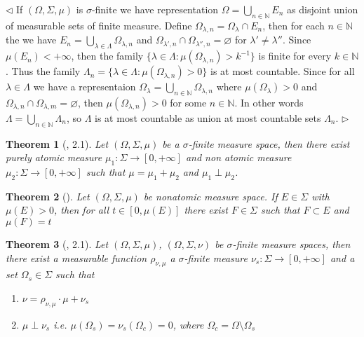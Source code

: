 \documentclass[12pt]{article}
\newtheorem{theorem}{Theorem}[subsection]
\newenvironment{proof}{\par $\triangleleft$}{$\triangleright$}
\begin{document}
\begin{proof}
    If $(\Omega,\Sigma,\mu)$ is $\sigma$-finite we have representation
    $\Omega=\bigcup_{n\in\mathbb{N}}E_n$ as disjoint union of measurable sets of
    finite measure. Define $\Omega_{\lambda, n}=\Omega_\lambda\cap E_n$, then
    for each $n\in\mathbb{N}$ the we have
    $E_n=\bigcup_{\lambda\in\Lambda}\Omega_{\lambda,n}$ and
    $\Omega_{\lambda',n}\cap\Omega_{\lambda'',n}=\varnothing$ for
    $\lambda'\neq\lambda''$. Since $\mu(E_n)<+\infty$, then the family $
        \{\lambda\in\Lambda:\mu(\Omega_{\lambda,n})>k^{-1} \}$ is finite for
    every
    $k\in\mathbb{N}$. Thus the family
    $\Lambda_n= \{\lambda\in\Lambda:\mu(\Omega_{\lambda,n})>0 \}$ is at
    most countable. Since for all $\lambda\in\Lambda$ we have a representaion
    $\Omega_\lambda=\bigcup_{n\in\mathbb{N}}\Omega_{\lambda,n}$ where
    $\mu(\Omega_\lambda)>0$ and
    $\Omega_{\lambda,n}\cap\Omega_{\lambda,m}=\varnothing$, then
    $\mu(\Omega_{\lambda,n})>0$ for some $n\in\mathbb{N}$. In other words
    $\Lambda=\bigcup_{n\in\mathbb{N}}\Lambda_n$, so $\Lambda$ is at most
    countable as union at most countable sets $\Lambda_n$.
\end{proof}

\begin{theorem}[\cite{RoyJAtNonAtMeas}, 2.1]\label{MeasSpDecomp} Let
    $(\Omega,\Sigma,\mu)$ be a $\sigma$-finite measure space, then there exist
    purely atomic measure $\mu_1:\Sigma\to[0,+\infty]$ and non atomic measure
    $\mu_2:\Sigma\to[0,+\infty]$ such that $\mu=\mu_1+\mu_2$ and
    $\mu_1\perp\mu_2$.
\end{theorem}

\begin{theorem}[\cite{SierpConFamlFunc}]\label{ContOfNonAtmMeas} Let
    $(\Omega,\Sigma,\mu)$ be nonatomic measure space. If $E\in\Sigma$  with
    $\mu(E)>0$, then for all $t\in[0,\mu(E)]$ there exist $F\in\Sigma$ such that
    $F\subset E$ and $\mu(F)=t$
\end{theorem}

\begin{theorem}[\cite{RoyJLebDecompTh}, 2.1]\label{LebMeasDecomp} Let
    $(\Omega,\Sigma,\mu)$, $(\Omega,\Sigma,\nu)$ be $\sigma$-finite measure
    spaces, then there exist a measurable function $\rho_{\nu,\mu}$ a
    $\sigma$-finite measure $\nu_s:\Sigma\to[0,+\infty]$ and a set
    $\Omega_s\in\Sigma$ such that
    \begin{enumerate}[label = (\roman*)]
        \item $\nu=\rho_{\nu,\mu}\cdot\mu+\nu_s$

        \item $\mu\perp\nu_s$ i.e.  $\mu(\Omega_s)=\nu_s(\Omega_c)=0$, where
              $\Omega_c=\Omega\setminus\Omega_s$
    \end{enumerate}
\end{theorem}
\end{document}
